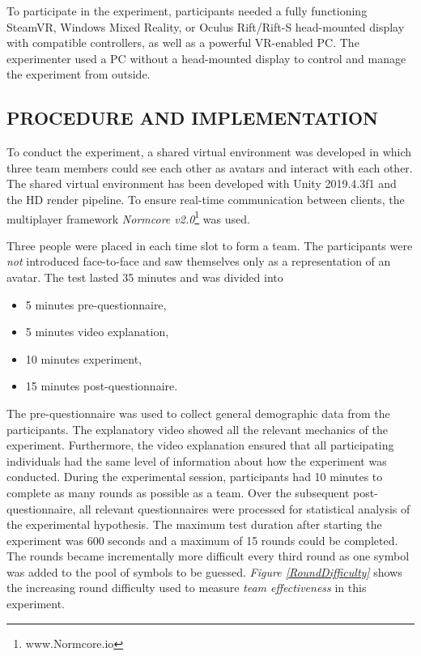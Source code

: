 \documentclass[sigchi]{acmart}
\begin{document}
To participate in the experiment, participants needed a fully functioning SteamVR, Windows Mixed Reality, or Oculus Rift/Rift-S head-mounted display with compatible controllers, as well as a powerful VR-enabled PC. The experimenter used a PC without a head-mounted display to control and manage the experiment from outside.

\subsection{PROCEDURE AND IMPLEMENTATION}
To conduct the experiment, a shared virtual environment was developed in which three team members could see each other as avatars and interact with each other. The shared virtual environment has been developed with Unity 2019.4.3f1 and the HD render pipeline. To ensure real-time communication between clients, the multiplayer framework \textit{Normcore v2.0}\footnote{www.Normcore.io} was used.

Three people were placed in each time slot to form a team. The participants were \textit{not} introduced face-to-face and saw themselves only as a representation of an avatar.
The test lasted 35 minutes and was divided into
		\begin{itemize}
			\item 5 minutes pre-questionnaire,
			\item 5 minutes video explanation,
			\item 10 minutes experiment,
			\item 15 minutes post-questionnaire.
		\end{itemize}
The pre-questionnaire was used to collect general demographic data from the participants. The explanatory video showed all the relevant mechanics of the experiment. Furthermore, the video explanation ensured that all participating individuals had the same level of information about how the experiment was conducted. During the experimental session, participants had 10 minutes to complete as many rounds as possible as a team. Over the subsequent post-questionnaire, all relevant questionnaires were processed for statistical analysis of the experimental hypothesis. The maximum test duration after starting the experiment was 600 seconds and a maximum of 15 rounds could be completed. The rounds became incrementally more difficult every third round as one symbol was added to the pool of symbols to be guessed.
\textit{Figure \ref{RoundDifficulty}} shows the increasing round difficulty used to measure \textit{team effectiveness} in this experiment.
\end{document}
